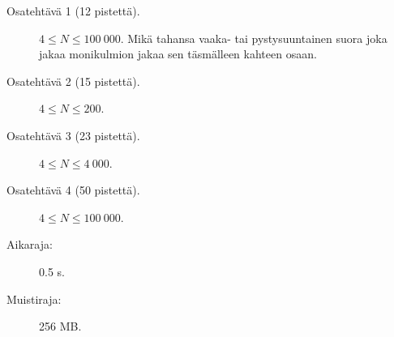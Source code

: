 \documentclass{boi2014-fi}
\begin{document}
    \Scoring

    \begin{description}
        \item[Osatehtävä 1 (12 pistettä).] $4 \le N \le 100\ 000$.
        Mikä tahansa vaaka- tai pystysuuntainen suora joka jakaa monikulmion jakaa
        sen täsmälleen kahteen osaan.
        \item[Osatehtävä 2 (15 pistettä).] $4 \le N \le 200$.
        \item[Osatehtävä 3 (23 pistettä).] $4 \le N \le 4\ 000$.
        \item[Osatehtävä 4 (50 pistettä).] $4 \le N \le 100\ 000$.
    \end{description}

    \Constraints

    \begin{description}
        \item[Aikaraja:] 0.5 s.
        \item[Muistiraja:] 256 MB.
    \end{description}
\end{document}
